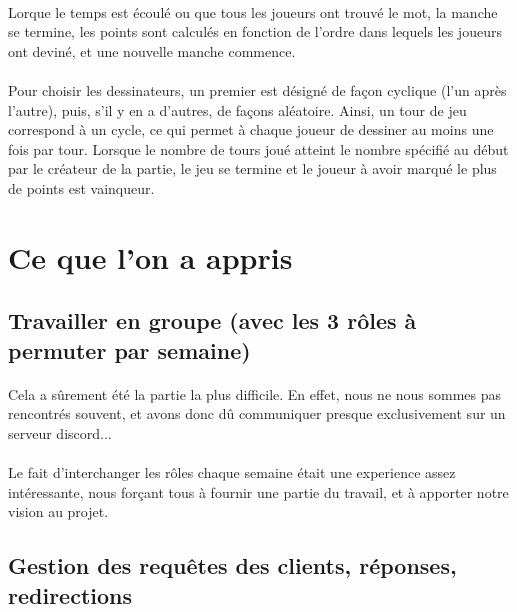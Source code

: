 \documentclass[11pt,a4paper]{article}
\begin{document}
                \paragraph{}
                Lorque le temps est écoulé ou que tous les joueurs ont trouvé le mot, la manche se termine,
                les points sont calculés en fonction de l'ordre dans lequels les joueurs ont deviné,
                et une nouvelle manche commence.
                \paragraph{}
                Pour choisir les dessinateurs, un premier est désigné de façon cyclique (l'un après l'autre),
                puis, s'il y en a d'autres, de façons aléatoire.
                Ainsi, un tour de jeu correspond à un cycle,
                ce qui permet à chaque joueur de dessiner au moins une fois par tour.
                Lorsque le nombre de tours joué atteint le nombre spécifié au début par le créateur de la partie,
                le jeu se termine et le joueur à avoir marqué le plus de points est vainqueur.

    \section{Ce que l'on a appris}
        \subsection*{Travailler en groupe (avec les 3 rôles à permuter par semaine)}
            \paragraph{}
            Cela a sûrement été la partie la plus difficile.
            En effet, nous ne nous sommes pas rencontrés souvent,
            et avons donc dû communiquer presque exclusivement sur un serveur discord...
            \paragraph{}
            Le fait d'interchanger les rôles chaque semaine était une experience assez intéressante,
            nous forçant tous à fournir une partie du travail,
            et à apporter notre vision au projet.
        \subsection*{Gestion des requêtes des clients, réponses, redirections}
\end{document}
